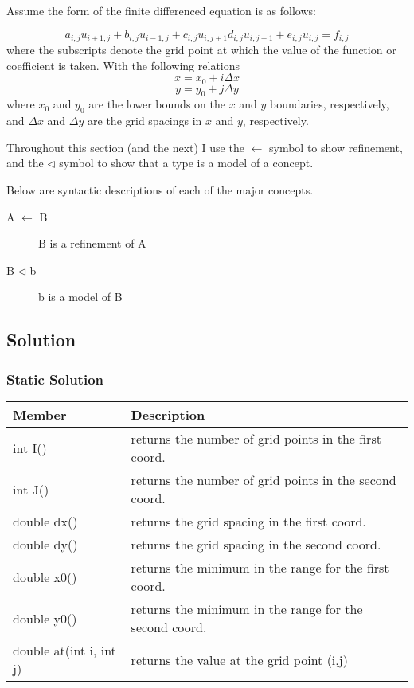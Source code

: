 \documentclass{article}
\begin{document}
Assume the form of the finite differenced equation is as follows:

\begin{equation}
a_{i,j} u_{i+1, j} + b_{i,j} u_{i-1, j} + c_{i,j} u_{i, j+1} d_{i,j} u_{i, j-1}
+ e_{i,j} u_{i, j} = f_{i,j}
\end{equation}
where the subscripts denote the grid point at which the value of the function or coefficient is taken.
With the following relations
\begin{equation}
x = x_{0} + i \Delta x
\end{equation}
\begin{equation}
y = y_{0} + j \Delta y
\end{equation}
where $x_0$ and $y_0$ are the lower bounds on the $x$ and $y$ boundaries, respectively, and $\Delta x$ and
$\Delta y$ are the grid spacings in $x$ and $y$, respectively.

Throughout this section (and the next) I use the $\leftarrow$ symbol to show refinement,
and the $\triangleleft$ symbol to show that a type is a model of a concept.

Below are syntactic descriptions of each of the major concepts.

\begin{description}
\item[A $\leftarrow$ B] B is a refinement of A
\item[B $\triangleleft$ b] b is a model of B
\end{description}

\subsection{Solution}
\subsubsection{Static Solution}

\begin{tabular}[!htb]{|p{5.25 cm}|p{8 cm}|}
\hline
Member&	Description\\
\hline
int I()&	returns the number of grid points in the first coord.\\
\hline
int J()&	returns the number of grid points in the second coord.\\
\hline
double dx()&	returns the grid spacing in the first coord.\\
\hline
double dy()&	returns the grid spacing in the second coord.\\
\hline
double x0()&	returns the minimum in the range for the first coord.\\
\hline
double y0()&	returns the minimum in the range for the second coord.\\
\hline
double at(int i, int j)&	returns the value at the grid point (i,j)\\
\hline
\end{tabular}
\end{document}
